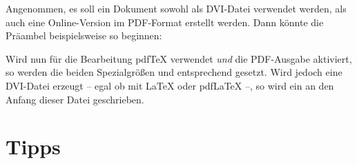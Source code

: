 \begin{Example}
  Angenommen, es soll ein Dokument sowohl als DVI-Datei verwendet
  werden, als auch eine Online-Version im PDF-Format erstellt
  werden. Dann könnte die Präambel beispielsweise so beginnen:
  Wird nun für die Bearbeitung {pdf\TeX} verwendet \emph{und} die
  PDF-Ausgabe aktiviert, so werden die beiden Spezialgrößen
   und  entsprechend gesetzt.
  Wird jedoch eine DVI-Datei erzeugt -- egal ob mit {\LaTeX} oder
  {pdf\LaTeX} --, so wird ein  an den Anfang dieser
  Datei geschrieben.
\end{Example}%
\EndIndexGroup
%
\EndIndexGroup

\section{Tipps}

